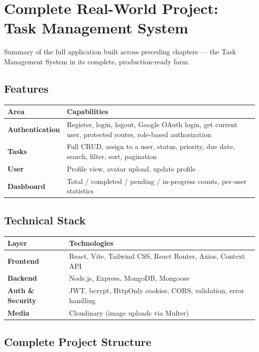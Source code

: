 \chapter{Complete Real-World Project: Task Management System}

Summary of the full application built across preceding chapters --- the Task Management System in its complete, production-ready form.

\section{Features}

\begin{tabularx}{\textwidth}{@{}>{\bfseries}p{3.2cm}X@{}}
\toprule
Area & Capabilities \\
\midrule
Authentication & Register, login, logout, Google OAuth login, get
current user, protected routes, role-based authorization \\
Tasks & Full CRUD, assign to a user, status, priority, due date, search,
filter, sort, pagination \\
User & Profile view, avatar upload, update profile \\
Dashboard & Total / completed / pending / in-progress counts, per-user
statistics \\
\bottomrule
\end{tabularx}

\section{Technical Stack}

\begin{tabularx}{\textwidth}{@{}>{\bfseries}p{3.2cm}X@{}}
\toprule
Layer & Technologies \\
\midrule
Frontend & React, Vite, Tailwind CSS, React Router, Axios, Context API \\
Backend & Node.js, Express, MongoDB, Mongoose \\
Auth \& Security & JWT, bcrypt, HttpOnly cookies, CORS, validation, error
handling \\
Media & Cloudinary (image uploads via Multer) \\
\bottomrule
\end{tabularx}

\section{Complete Project Structure}

